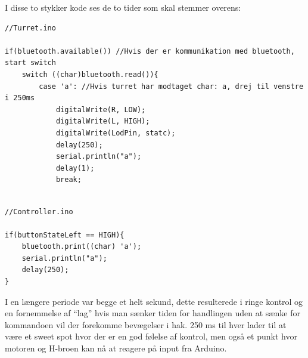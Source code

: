 I disse to stykker kode ses de to tider som skal stemmer overens: 

\begin{lstlisting}[style=CStyle]
//Turret.ino

if(bluetooth.available()) //Hvis der er kommunikation med bluetooth, start switch
	switch ((char)bluetooth.read()){
		case 'a': //Hvis turret har modtaget char: a, drej til venstre i 250ms
			digitalWrite(R, LOW);
			digitalWrite(L, HIGH);
			digitalWrite(LodPin, statc);
			delay(250);
			serial.println("a");
			delay(1);
			break;	
			
\end{lstlisting}

\begin{lstlisting}[style=CStyle]
//Controller.ino

if(buttonStateLeft == HIGH){
	bluetooth.print((char) 'a');
	serial.println("a");
	delay(250);
}

\end{lstlisting}


I en længere periode var begge et helt sekund, dette resulterede i ringe kontrol og en fornemmelse af “lag” hvis man sænker tiden for handlingen uden at sænke for kommandoen vil der forekomme bevægelser i hak. 250 ms til hver lader til at være et sweet spot hvor der er en god følelse af kontrol, men også et punkt hvor motoren og H-broen kan nå at reagere på input fra Arduino.








